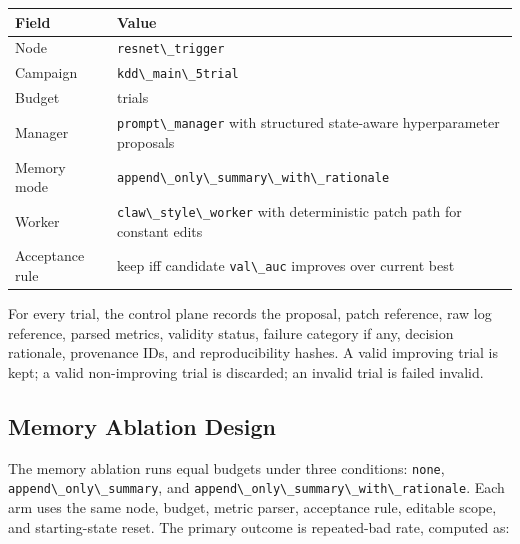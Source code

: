 \begin{table}[t]
\small
\begin{tabular}{@{}
  >{\raggedright\arraybackslash}p{}
  >{\raggedright\arraybackslash}p{}@{}}
\toprule
\begin{minipage}[b]{\linewidth}\raggedright
Field
\end{minipage} & \begin{minipage}[b]{\linewidth}\raggedright
Value
\end{minipage} \\
\midrule
\bottomrule
Node & \passthrough{\lstinline!resnet\_trigger!} \\
Campaign & \passthrough{\lstinline!kdd\_main\_5trial!} \\
Budget & 5 trials \\
Manager & \passthrough{\lstinline!prompt\_manager!} with structured state-aware hyperparameter proposals \\
Memory mode & \passthrough{\lstinline!append\_only\_summary\_with\_rationale!} \\
Worker & \passthrough{\lstinline!claw\_style\_worker!} with deterministic patch path for constant edits \\
Acceptance rule & keep iff candidate \passthrough{\lstinline!val\_auc!} improves over current best \\
\end{tabular}
\end{table}

For every trial, the control plane records the proposal, patch reference, raw log reference, parsed metrics, validity status, failure category if any, decision rationale, provenance IDs, and reproducibility hashes. A valid improving trial is kept; a valid non-improving trial is discarded; an invalid trial is failed invalid.

\subsection{Memory Ablation Design}\label{memory-ablation-design}

The memory ablation runs equal budgets under three conditions: \passthrough{\lstinline!none!}, \passthrough{\lstinline!append\_only\_summary!}, and \passthrough{\lstinline!append\_only\_summary\_with\_rationale!}. Each arm uses the same node, budget, metric parser, acceptance rule, editable scope, and starting-state reset. The primary outcome is repeated-bad rate, computed as:

